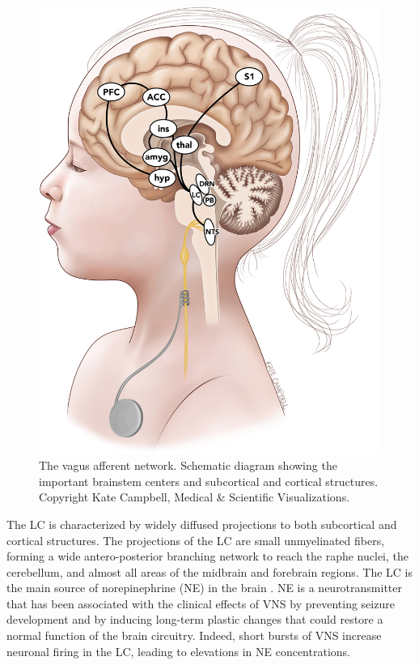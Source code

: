   \begin{figure}[h]
    \begin{minipage}[c]{0.5\textwidth}
      \includegraphics[width=\textwidth]{images/vagus_afferent_network.jpg}
    \end{minipage}\hfill
    \begin{minipage}[c]{0.5\textwidth}
      \caption{The vagus afferent network. Schematic diagram showing the important brainstem centers and subcortical and cortical structures. Copyright Kate Campbell, Medical \& Scientific Visualizations.} 
    \end{minipage}
    \centering
    \label{fig:Vagus Afferent Network}
  \end{figure}

  The LC is characterized by widely diffused projections to both subcortical and cortical structures. The projections of the LC are small unmyelinated fibers, forming a wide antero-posterior branching network to reach the raphe nuclei, the cerebellum, and almost all areas of the midbrain and forebrain regions. The LC is the main source of norepinephrine (NE) in the brain \cite{AGHAJANIAN1977570}. NE is a neurotransmitter that has been associated with the clinical effects of VNS by preventing seizure development and by inducing long-term plastic changes that could restore a normal function of the brain circuitry. Indeed, short bursts of VNS increase neuronal firing in the LC, leading to elevations in NE concentrations. \cite{BergerVespa2021}

